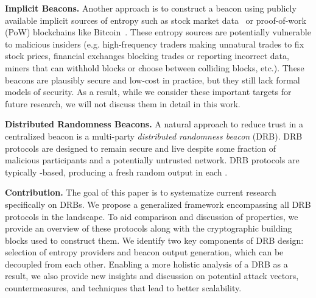 \textbf{Implicit Beacons.} Another approach is to construct a beacon using publicly available implicit sources of entropy such as stock market data~\cite{clark2010use} or proof-of-work (PoW) blockchains like Bitcoin~\cite{nakamoto2008bitcoin, bentov2016bitcoin, bonneau2015bitcoin, han2020randchain}. These entropy sources are potentially vulnerable to malicious insiders (e.g. high-frequency traders making unnatural trades to fix stock prices, financial exchanges blocking trades or reporting incorrect data, miners that can withhold blocks or choose between colliding blocks, etc.). These beacons are plausibly secure and low-cost in practice, but they still lack formal models of security. As a result, while we consider these important targets for future research, we will not discuss them in detail in this work.

\textbf{Distributed Randomness Beacons.}
A natural approach to reduce trust in a centralized beacon is a multi-party \textit{distributed randomness beacon} (DRB). DRB protocols are designed to remain secure and live despite some fraction of malicious participants and a potentially untrusted network. %
DRB protocols are typically \epoch-based, producing a fresh random output in each \epoch.

\textbf{Contribution.} The goal of this paper is to systematize current research specifically on DRBs. We propose a generalized framework encompassing all DRB protocols in the landscape. To aid comparison and discussion of properties, we provide an overview of these protocols along with the cryptographic building blocks used to construct them. We identify two key components of DRB design: selection of entropy providers and beacon output generation, which can be decoupled from each other. Enabling a more holistic analysis of a DRB as a result, we also provide new insights and discussion on potential attack vectors, countermeasures, and techniques that lead to better scalability.

